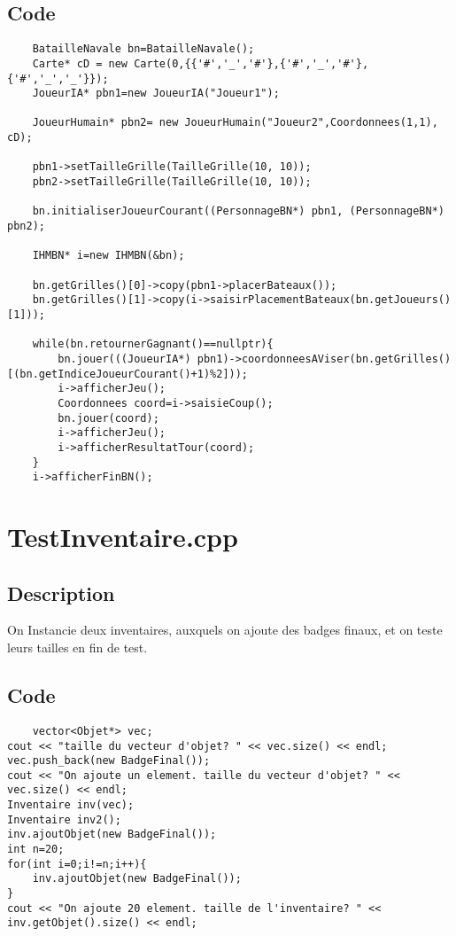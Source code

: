         \subsection{Code}
\begin{lstlisting}
	BatailleNavale bn=BatailleNavale();
	Carte* cD = new Carte(0,{{'#','_','#'},{'#','_','#'},{'#','_','_'}});
	JoueurIA* pbn1=new JoueurIA("Joueur1");
	
    JoueurHumain* pbn2= new JoueurHumain("Joueur2",Coordonnees(1,1), cD);

    pbn1->setTailleGrille(TailleGrille(10, 10));
    pbn2->setTailleGrille(TailleGrille(10, 10));

    bn.initialiserJoueurCourant((PersonnageBN*) pbn1, (PersonnageBN*) pbn2);

	IHMBN* i=new IHMBN(&bn);

	bn.getGrilles()[0]->copy(pbn1->placerBateaux());
    bn.getGrilles()[1]->copy(i->saisirPlacementBateaux(bn.getJoueurs()[1]));

	while(bn.retournerGagnant()==nullptr){
		bn.jouer(((JoueurIA*) pbn1)->coordonneesAViser(bn.getGrilles()[(bn.getIndiceJoueurCourant()+1)%2]));
		i->afficherJeu();
		Coordonnees coord=i->saisieCoup();
		bn.jouer(coord);
		i->afficherJeu();
		i->afficherResultatTour(coord);
	}
	i->afficherFinBN();
	\end{lstlisting}
    \section{TestInventaire.cpp}
        \subsection{Description}
            On Instancie deux inventaires, auxquels on ajoute des badges finaux, et on teste leurs tailles en fin de test.
        \subsection{Code}
\begin{lstlisting}
	vector<Objet*> vec;
cout << "taille du vecteur d'objet? " << vec.size() << endl;
vec.push_back(new BadgeFinal());
cout << "On ajoute un element. taille du vecteur d'objet? " << vec.size() << endl;
Inventaire inv(vec);
Inventaire inv2();
inv.ajoutObjet(new BadgeFinal());
int n=20;
for(int i=0;i!=n;i++){
	inv.ajoutObjet(new BadgeFinal());
}
cout << "On ajoute 20 element. taille de l'inventaire? " << inv.getObjet().size() << endl;
	\end{lstlisting}
